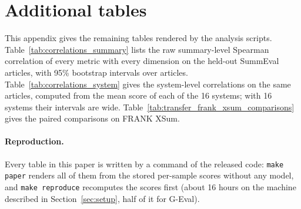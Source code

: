 \section{Additional tables}
\label{app:tables}

This appendix gives the remaining tables rendered by the analysis scripts. Table~\ref{tab:correlations_summary} lists the raw summary-level Spearman correlation of every metric with every dimension on the held-out SummEval articles, with 95\% bootstrap intervals over articles. Table~\ref{tab:correlations_system} gives the system-level correlations on the same articles, computed from the mean score of each of the 16 systems; with 16 systems their intervals are wide. Table~\ref{tab:transfer_frank_xsum_comparisons} gives the paired comparisons on FRANK XSum.

\paragraph{Reproduction.} Every table in this paper is written by a command of the released code: \texttt{make paper} renders all of them from the stored per-sample scores without any model, and \texttt{make reproduce} recomputes the scores first (about 16 hours on the machine described in Section~\ref{sec:setup}, half of it for G-Eval).
